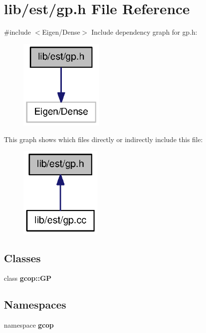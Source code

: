 \section{lib/est/gp.h \-File \-Reference}
\label{gp_8h}
{\ttfamily \#include $<$\-Eigen/\-Dense$>$}\*
\-Include dependency graph for gp.\-h\-:\nopagebreak
\begin{figure}[H]
\begin{center}
\leavevmode
\includegraphics[width=116pt]{gp_8h__incl}
\end{center}
\end{figure}
\-This graph shows which files directly or indirectly include this file\-:\nopagebreak
\begin{figure}[H]
\begin{center}
\leavevmode
\includegraphics[width=114pt]{gp_8h__dep__incl}
\end{center}
\end{figure}
\subsection*{\-Classes}
\begin{DoxyCompactItemize}
\item 
class {\bf gcop\-::\-G\-P}
\end{DoxyCompactItemize}
\subsection*{\-Namespaces}
\begin{DoxyCompactItemize}
\item 
namespace {\bf gcop}
\end{DoxyCompactItemize}
